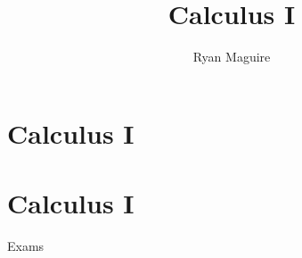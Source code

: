 \documentclass[crop=false,class=book,oneside]{standalone}
\begin{document}
    \newif\ifmathcoursescalculusI
    \ifx\ifmathcourses\undefined
        \title{Calculus I}
        \author{Ryan Maguire}
        \date{\vspace{-5ex}}
        \maketitle
        \tableofcontents
        \chapter*{Calculus I}
        \setcounter{chapter}{1}
    \else
        \chapter{Calculus I}
    \fi
    {Exams}
\end{document}

